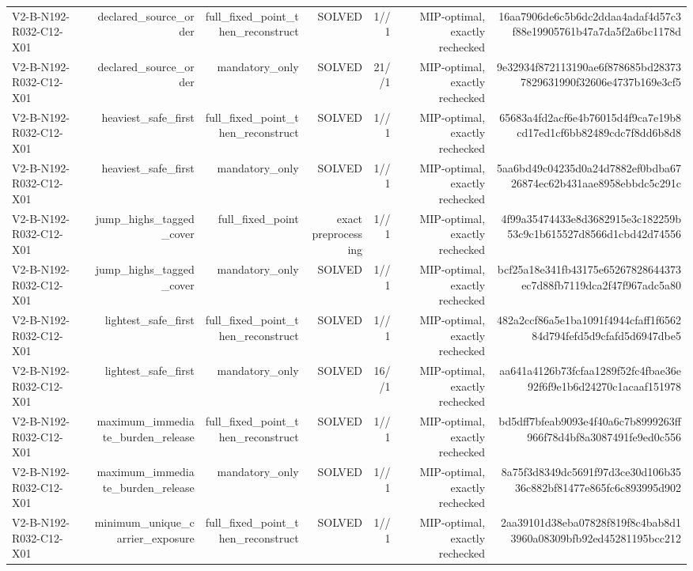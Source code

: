 {\begin{longtable}{lrrrrrr}
V2-B-N192-R032-C12-X01 & declared\_source\_order & full\_fixed\_point\_then\_reconstruct & SOLVED & 1//1 & MIP-optimal, exactly rechecked & 16aa7906de6c5b6dc2ddaa4adaf4d57c3f88e19905761b47a7da5f2a6bc1178d \\
V2-B-N192-R032-C12-X01 & declared\_source\_order & mandatory\_only & SOLVED & 21//1 & MIP-optimal, exactly rechecked & 9e32934f872113190ae6f878685bd283737829631990f32606e4737b169e3cf5 \\
V2-B-N192-R032-C12-X01 & heaviest\_safe\_first & full\_fixed\_point\_then\_reconstruct & SOLVED & 1//1 & MIP-optimal, exactly rechecked & 65683a4fd2acf6e4b76015d4f9ca7e19b8cd17ed1cf6bb82489cdc7f8dd6b8d8 \\
V2-B-N192-R032-C12-X01 & heaviest\_safe\_first & mandatory\_only & SOLVED & 1//1 & MIP-optimal, exactly rechecked & 5aa6bd49c04235d0a24d7882ef0bdba6726874ec62b431aae8958ebbdc5c291c \\
V2-B-N192-R032-C12-X01 & jump\_highs\_tagged\_cover & full\_fixed\_point & exact preprocessing & 1//1 & MIP-optimal, exactly rechecked & 4f99a35474433e8d3682915e3c182259b53c9c1b615527d8566d1cbd42d74556 \\
V2-B-N192-R032-C12-X01 & jump\_highs\_tagged\_cover & mandatory\_only & SOLVED & 1//1 & MIP-optimal, exactly rechecked & bcf25a18e341fb43175e65267828644373ec7d88fb7119dca2f47f967adc5a80 \\
V2-B-N192-R032-C12-X01 & lightest\_safe\_first & full\_fixed\_point\_then\_reconstruct & SOLVED & 1//1 & MIP-optimal, exactly rechecked & 482a2ccf86a5e1ba1091f4944cfaff1f656284d794fefd5d9cfafd5d6947dbe5 \\
V2-B-N192-R032-C12-X01 & lightest\_safe\_first & mandatory\_only & SOLVED & 16//1 & MIP-optimal, exactly rechecked & aa641a4126b73fcfaa1289f52fc4fbae36e92f6f9e1b6d24270c1acaaf151978 \\
V2-B-N192-R032-C12-X01 & maximum\_immediate\_burden\_release & full\_fixed\_point\_then\_reconstruct & SOLVED & 1//1 & MIP-optimal, exactly rechecked & bd5dff7bfeab9093e4f40a6c7b8999263ff966f78d4bf8a3087491fe9ed0c556 \\
V2-B-N192-R032-C12-X01 & maximum\_immediate\_burden\_release & mandatory\_only & SOLVED & 1//1 & MIP-optimal, exactly rechecked & 8a75f3d8349dc5691f97d3ce30d106b3536c882bf81477e865fc6c893995d902 \\
V2-B-N192-R032-C12-X01 & minimum\_unique\_carrier\_exposure & full\_fixed\_point\_then\_reconstruct & SOLVED & 1//1 & MIP-optimal, exactly rechecked & 2aa39101d38eba07828f819f8c4bab8d13960a08309bfb92ed45281195bcc212 \\

\end{longtable}}
